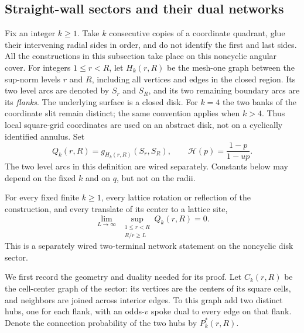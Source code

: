\subsection{Straight-wall sectors and their dual networks}
\label{sector:radial-setup}

Fix an integer $k\geq1$.  Take $k$ consecutive copies of a coordinate
quadrant, glue their intervening radial sides in order, and do not identify
the first and last sides.  All the constructions in this subsection take
place on this noncyclic angular cover.  For integers $1\leq r<R$, let
$H_k(r,R)$ be the mesh-one graph between the sup-norm levels $r$ and $R$,
including all vertices and edges in the closed region.  Its two level
arcs are denoted by $S_r$ and $S_R$, and its two remaining boundary arcs
are its \emph{flanks}.  The underlying surface is a closed disk.  For
$k=4$ the two banks of the coordinate slit remain distinct; the same
convention applies when $k>4$.  Thus local square-grid coordinates are
used on an abstract disk, not on a cyclically identified annulus.
Set
\begin{equation}\label{sector:Q-definition}
 Q_k(r,R)=g_{H_k(r,R)}(S_r,S_R),
 \qquad
 \mathcal H(p)=\frac{1-p}{1-up}.
\end{equation}
The two level arcs in this definition are wired separately.  Constants
below may depend on the fixed $k$ and on $q$, but not on the radii.

\begin{proposition}\label{prop:sector-network}
For every fixed finite $k\geq1$, every lattice rotation or reflection of
the construction, and every translate of its center to a lattice site,
\begin{equation}\label{sector:network-decay}
 \lim_{L\to\infty}\ \sup_{\substack{1\leq r<R\\R/r\geq L}}
 Q_k(r,R)=0.
\end{equation}
This is a separately wired two-terminal network statement on the
noncyclic disk sector.
\end{proposition}

We first record the geometry and duality needed for its proof.  Let
$C_k(r,R)$ be the cell-center graph of the sector: its vertices are the
centers of its square cells, and neighbors are joined across interior
edges.  To this graph add two distinct hubs, one for each flank, with an
odds-$v$ spoke dual to every edge on that flank.  Denote the connection
probability of the two hubs by $P_k^*(r,R)$.

